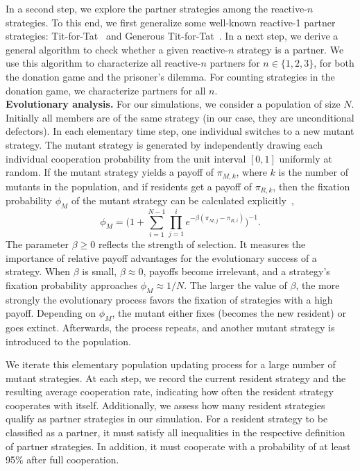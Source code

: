 \documentclass[9pt,twocolumn,twoside]{pnas-new}
\begin{document}
In a second step, we explore the partner strategies among the reactive-$n$ strategies. 
To this end, we first generalize some well-known reactive-1 partner strategies: Tit-for-Tat~\citep{axelrod:AAAS:1981} and Generous Tit-for-Tat~\citep{nowak:Nature:1992,molander:jcr:1985}. 
In a next step, we derive a general algorithm to check whether a given reactive-$n$ strategy is a partner. 
We use this algorithm to characterize all reactive-$n$ partners for $n\!\in\!\{1,2,3\}$, for both the donation game and the prisoner's dilemma. 
For counting strategies in the donation game, we characterize partners for all $n$.\\

\noindent
{\bf Evolutionary analysis.} 
For our simulations, we consider a population of size \(N\). 
Initially all members are of the same strategy (in our case, they are unconditional defectors). 
In each elementary time step, one individual switches to a new mutant strategy. 
The mutant strategy is generated by independently drawing each individual cooperation probability from the unit interval \([0,1]\) uniformly at random. 
If the mutant strategy yields a payoff of \(\pi_{M, k}\), where \(k\) is the number of
mutants in the population, and if residents get a payoff of \(\pi_{R,
k}\), then the fixation probability \(\phi_{M}\) of the mutant strategy can be
calculated explicitly~\citep{nowak:Nature:2004},
\begin{equation}\label{eq:fixation_probability}
  \phi_{M} =\Big(1 + \displaystyle \sum_{i=1}^{N - 1} \prod_{j=1}^{i} e^{- \beta (\pi_{M, j} - \pi_{R, i})} \Big)^{-1}.
\end{equation}
The parameter \(\beta \geq 0\) reflects the strength of selection. 
It measures the importance of relative payoff advantages for the evolutionary success of a strategy. 
When \(\beta\) is small, \(\beta \approx 0\), payoffs become irrelevant, and a strategy's fixation probability approaches
\(\phi_{M} \approx 1 / N\). 
The larger the value of \(\beta\), the more strongly the evolutionary process favors the fixation of strategies with a high
payoff.
Depending on \(\phi_{M}\), the mutant either fixes (becomes the new resident) or goes extinct. 
Afterwards, the process repeats, and another mutant strategy is introduced to the population. 

We iterate this elementary population updating process for a large number of
mutant strategies. At each step, we record the current resident
strategy and the resulting average cooperation rate, indicating how often the
resident strategy cooperates with itself. Additionally, we assess how many
resident strategies qualify as partner strategies in our simulation. For a
resident strategy to be classified as a partner, it must satisfy all
inequalities in the respective definition of partner strategies. 
In addition, it must cooperate with a probability of at least 95\% after full cooperation.\\
\end{document}
